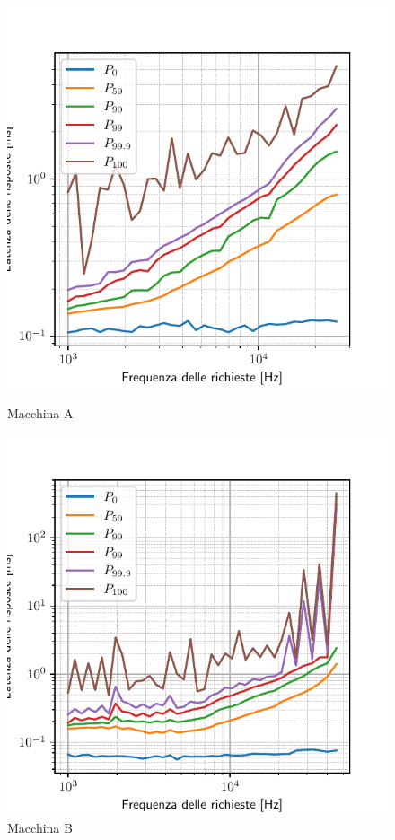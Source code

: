 \begin{figure}[htbp]
    \centering
    \begin{minipage}[t]{0.48\textwidth}
        \centering
        \includegraphics[width=\textwidth]{03-risultati/bench-get-a}
        \caption*{Macchina A}
    \end{minipage}
    \hfill
    \begin{minipage}[t]{0.48\textwidth}
        \centering
        \includegraphics[width=\textwidth]{03-risultati/bench-get-c}
        \caption*{Macchina B}
    \end{minipage}


\end{figure}
